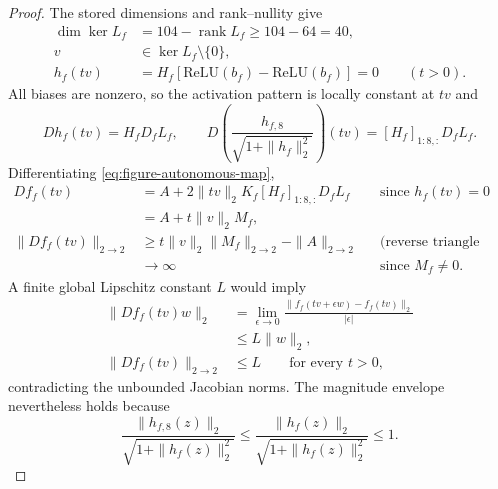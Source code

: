 \documentclass{l4dc2027}
\begin{document}
\begin{proof}
The stored dimensions and rank--nullity give
\[
 \begin{aligned}
 \dim\ker L_f&=104-\operatorname{rank}L_f\ge104-64=40,\\
 v&\in\ker L_f\setminus\{0\},\\
 h_f(tv)&=H_f[\mathrm{ReLU}(b_f)-\mathrm{ReLU}(b_f)]=0
 \qquad(t>0).
 \end{aligned}
\]
All biases are nonzero, so the activation pattern is locally constant at \mbox{$tv$} and
\[
 Dh_f(tv)=H_fD_fL_f,\qquad
 D\left(\frac{h_{f,8}}{\sqrt{1+\|h_f\|_2^2}}\right)(tv)
 =[H_f]_{1:8,:}D_fL_f.
\]
Differentiating \eqref{eq:figure-autonomous-map},
\[
 \begin{aligned}
 Df_f(tv)
 &=A+2\|tv\|_2K_f[H_f]_{1:8,:}D_fL_f
 &&\text{since }h_f(tv)=0\\
 &=A+t\|v\|_2M_f,\\
 \|Df_f(tv)\|_{2\to2}
 &\ge t\|v\|_2\|M_f\|_{2\to2}-\|A\|_{2\to2}
 &&\text{(reverse triangle inequality)}\\
 &\longrightarrow\infty
 &&\text{since }M_f\ne0.
 \end{aligned}
\]
A finite global Lipschitz constant \mbox{$L$} would imply
\[
 \begin{aligned}
 \|Df_f(tv)w\|_2
 &=\lim_{\epsilon\to0}
   \frac{\|f_f(tv+\epsilon w)-f_f(tv)\|_2}{|\epsilon|}\\
 &\le L\|w\|_2,\\
 \|Df_f(tv)\|_{2\to2}&\le L\qquad\text{for every }t>0,
 \end{aligned}
\]
contradicting the unbounded Jacobian norms.
The magnitude envelope nevertheless holds because
\[
 \frac{\|h_{f,8}(z)\|_2}{\sqrt{1+\|h_f(z)\|_2^2}}
 \le\frac{\|h_f(z)\|_2}{\sqrt{1+\|h_f(z)\|_2^2}}\le1.
\]
\end{proof}
\end{document}
